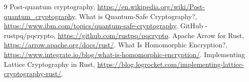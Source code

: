 \documentclass[12pt]{article}
\begin{document}

\begin{thebibliography}{9}
 Post-quantum cryptography, \url{https://en.wikipedia.org/wiki/Post-quantum_cryptography}.
 What is Quantum-Safe Cryptography?, \url{https://www.ibm.com/topics/quantum-safe-cryptography}.
 GitHub - rustpq/pqcrypto, \url{https://github.com/rustpq/pqcrypto}.
 Apache Arrow for Rust, \url{https://arrow.apache.org/docs/rust/}.
 What Is Homomorphic Encryption?, \url{https://www.integrate.io/blog/what-is-homomorphic-encryption/}.
 Implementing Lattice Cryptography in Rust, \url{https://blog.logrocket.com/implementing-lattice-cryptography-rust/}.
\end{thebibliography}
\end{document}
